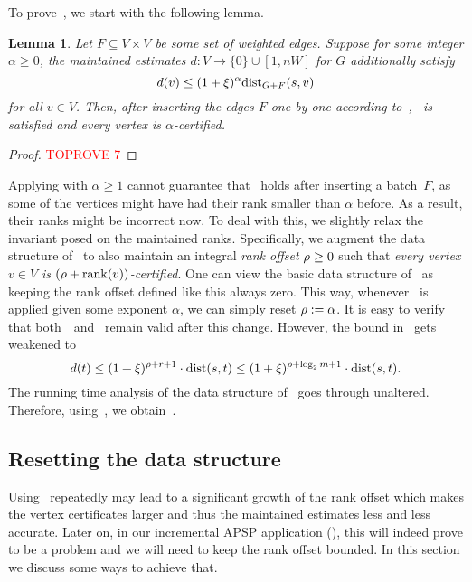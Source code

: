 \documentclass[11pt,letterpaper]{article}
\theoremstyle{plain}
\newtheorem{lemma}[theorem]{Lemma}
\newcommand{\dist}{\mathrm{dist}}
\DeclareMathOperator*{\rank}{rank}
\begin{document}
To prove~, we start with the following lemma.
\begin{lemma}\label{l:insert-arbitrary}
  Let $F\subseteq V\times V$ be some set of weighted edges.
  Suppose for some integer $\alpha\geq 0$, the maintained estimates $d:V\to\{0\}\cup [1,nW]$ for $G$ additionally satisfy
  \begin{equation}\label{eq:guarantee}
    d(v)\leq (1+\epsp)^{\alpha}\dist_{G+F}(s,v)
  \end{equation}
  for all $v\in V$. Then, after inserting the edges $F$ one by one according to~,~ is satisfied and
  every vertex is $\alpha$-certified.
\end{lemma}
\begin{proof}\textcolor{red}{TOPROVE 7}\end{proof}
Applying  with $\alpha\geq 1$ cannot guarantee that~ holds after inserting a batch~$F$,
as some of the vertices might have had their rank smaller than $\alpha$ before.
As a result, their ranks might be incorrect now.
To deal with this, we slightly relax the invariant posed on the maintained ranks. Specifically, we augment the data structure of~ to also maintain an integral \emph{rank offset} $\rho\geq 0$
such that \emph{every vertex $v\in V$ is $(\roff+\rank(v))$-certified}.
One can view the basic data structure of~ as keeping the rank offset defined like this always zero.
This way, whenever~ is applied given some exponent $\alpha$,
we can simply reset $\rho:=\alpha$.
It is easy to verify that both~~and~ remain valid after this change.
However, the bound in~ gets weakened to
\begin{equation}
  d(t)\leq (1+\epsp)^{\roff+r+1}\cdot\dist(s,t)\leq (1+\epsp)^{\roff+\log_2{m}+1}\cdot \dist(s,t).
\end{equation}
The running time analysis of the data structure of~ goes through unaltered.
Therefore, using~, we obtain~.


\subsection{Resetting the data structure}\label{sec:resetting}
Using~ repeatedly may lead to a significant growth of the rank offset
which makes the vertex certificates larger and thus the maintained estimates less and less accurate.
Later on, in our incremental APSP application (), this will indeed prove to be a problem
and we will need to keep the rank offset bounded.
In this section we discuss some ways to achieve that.
\end{document}
